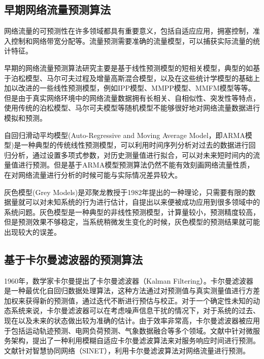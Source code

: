 \subsection{早期网络流量预测算法}

网络流量的可预测性在许多领域都具有重要意义，包括自适应应用，拥塞控制，准入控制和网络带宽分配等。流量预测需要准确的流量模型，可以捕获实际流量的统计特征\cite{feng2005study}。

早期的网络流量预测算法研究主要是基于线性预测模型的短相关模型，典型的如基于泊松模型、马尔可夫过程及增量高斯混合模型，以及在这些统计学模型的基础上加以改进的一些线性预测模型，例如IPP模型、MMPP模型、MMFM模型等等\cite{2013基于时间相关的网络流量建模与预测研究}。但是由于真实网络环境中的网络流量数据拥有长相关、自相似性、突发性等特点，使用传统的泊松模型、马尔可夫模型等随机模型不能够很好地对网络流量数据进行模拟和预测\cite{段智彬2009基于}。

自回归滑动平均模型(Auto-Regressive and Moving Average Model，即ARMA模型)是一种典型的传统线性预测模型，可以利用时间序列分析对过去的数据进行回归分析，通过设置多项式参数，对历史测量值进行拟合，可以对未来短时间内的流量值进行预测\cite{段智彬2009基于,陈广居2017网络流量预测,林义勇2017ARMA}。但是基于ARMA模型预测算法仍然不能有效刻画网络流量性质，在对网络流量进行分析的时候可能与实际情况差异较大\cite{2013基于时间相关的网络流量建模与预测研究}。

灰色模型(Grey Models)是邓聚龙教授于1982年提出的一种理论，只需要有限的数据量就可以对未知系统的行为进行估计，自提出以来便被成功应用到很多领域中的系统问题\cite{kayacan2010grey}。灰色模型是一种典型的非线性预测模型，计算量较小，预测精度较高，但是预测效果不够稳定，当系统稍微发生变化的时候，灰色模型的预测结果就可能出现较大的误差\cite{陈广居2017网络流量预测}。

\subsection{基于卡尔曼滤波器的预测算法}

1960年，数学家卡尔曼提出了卡尔曼滤波器（Kalman Filtering）\cite{kalman1960new}。卡尔曼滤波器是一种最优化自回归数据处理算法，这种方法通过对预测值与真实测量值进行方差加权来获得新的预测值，通过迭代不断进行预估与校正\cite{彭丁聪2009卡尔曼滤波的基本原理及应用}。对于一个确定性未知的动态系统来说，卡尔曼滤波器可以在考虑噪声信息干扰的情况下，对于系统的过去、现在以及未来的状态做出较为准确的估计\cite{muruganantham2016evolutionary}。由于效率非常高，卡尔曼滤波器被应用于包括运动轨迹预测\cite{成光2006基于卡尔曼滤波的目标估计和预测方法研究}、电网负荷预测\cite{刘鑫2019基于改进卡尔曼滤波算法的短期负荷预测}、气象数据融合\cite{周艳青2018基于改进的卡尔曼滤波算法的气象数据融合}等多个领域。文献\cite{郝庭毅2017面向微服务架构的容器级弹性资源供给方法}中针对微服务架构，提出了一种利用模糊自适应卡尔曼滤波算法来对服务响应时间进行预测。文献\cite{贾濡2018基于卡尔曼滤波的流量预测机制}针对智慧协同网络（SINET），利用卡尔曼滤波算法对网络流量进行预测。

